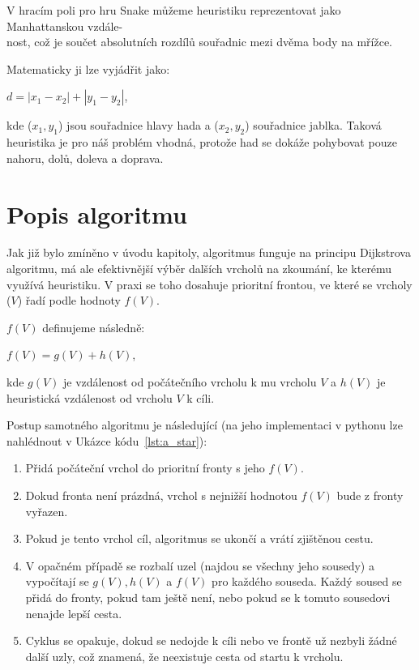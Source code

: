 V hracím poli pro hru Snake můžeme heuristiku reprezentovat jako Manhattanskou vzdále-\\nost, což je součet absolutních rozdílů souřadnic mezi dvěma body na mřížce. 

Matematicky ji lze vyjádřit jako:

\begin{center}
    \(d = |x_1 - x_2| + |y_1 - y_2|\),
\end{center}

kde (\(x_1, y_1\)) jsou souřadnice hlavy hada a (\(x_2, y_2\)) souřadnice jablka. Taková heuristika je pro náš problém vhodná, protože had se dokáže pohybovat pouze nahoru, dolů, doleva a doprava. 

\section{Popis algoritmu}

Jak již bylo zmíněno v úvodu kapitoly, algoritmus funguje na principu Dijkstrova algoritmu, má ale efektivnější výběr dalších vrcholů na zkoumání, ke kterému využívá heuristiku. V praxi se toho dosahuje prioritní frontou, ve které se vrcholy (\(V\)) řadí podle hodnoty \(f(V)\).

\(f(V)\) definujeme následně:

\begin{center}
    \(f(V) = g(V) + h(V)\),
\end{center}

kde \(g(V)\) je vzdálenost od počátečního vrcholu k mu vrcholu \(V\) a \(h(V)\) je heuristická vzdálenost od vrcholu \(V\) k cíli. 

Postup samotného algoritmu je následující (na jeho implementaci v pythonu lze nahlédnout v Ukázce kódu~\ref{lst:a_star}):

\begin{enumerate}
    \item Přidá počáteční vrchol do prioritní fronty s jeho \(f(V)\).
    \item Dokud fronta není prázdná, vrchol s nejnižší hodnotou \(f(V)\) bude z fronty vyřazen.
    \item Pokud je tento vrchol cíl, algoritmus se ukončí a vrátí zjištěnou cestu.
    \item V opačném případě se rozbalí uzel (najdou se všechny jeho sousedy) a vypočítají se \(g(V), h(V)\) a \(f(V)\) pro každého souseda. Každý soused se přidá do fronty, pokud tam ještě není, nebo pokud se k tomuto sousedovi nenajde lepší cesta.
    \item Cyklus se opakuje, dokud se nedojde k cíli nebo ve frontě už nezbyli žádné další uzly, což znamená, že neexistuje cesta od startu k vrcholu.
\end{enumerate}

